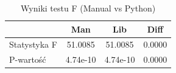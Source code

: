 \begin{table}[H]
\caption{Wyniki testu F (Manual vs Python)}
\label{tab:zad2_f}
\begin{tabular}{lccc}
\toprule
 & Man & Lib & Diff \\
\midrule
Statystyka F & 51.0085 & 51.0085 & 0.0000 \\
P-wartość & 4.74e-10 & 4.74e-10 & 0.0000 \\
\bottomrule
\end{tabular}
\end{table}

